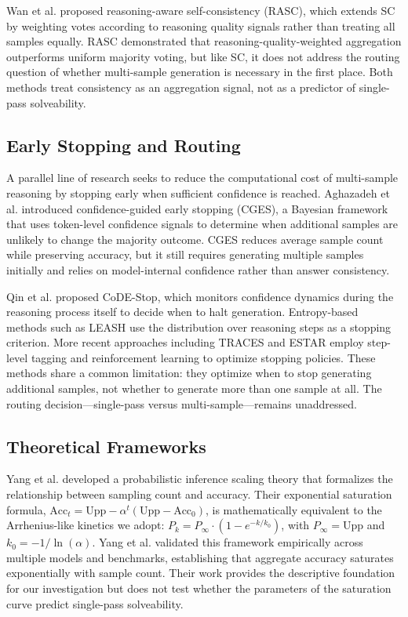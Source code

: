 \documentclass{article}
\begin{document}
Wan et al. \citep{wan2024rasc} proposed reasoning-aware self-consistency (RASC), which extends SC by weighting votes according to reasoning quality signals rather than treating all samples equally. RASC demonstrated that reasoning-quality-weighted aggregation outperforms uniform majority voting, but like SC, it does not address the routing question of whether multi-sample generation is necessary in the first place. Both methods treat consistency as an aggregation signal, not as a predictor of single-pass solveability.

\subsection{Early Stopping and Routing}

A parallel line of research seeks to reduce the computational cost of multi-sample reasoning by stopping early when sufficient confidence is reached. Aghazadeh et al. \citep{aghazadeh2023cges} introduced confidence-guided early stopping (CGES), a Bayesian framework that uses token-level confidence signals to determine when additional samples are unlikely to change the majority outcome. CGES reduces average sample count while preserving accuracy, but it still requires generating multiple samples initially and relies on model-internal confidence rather than answer consistency.

Qin et al. \citep{qin2024codestop} proposed CoDE-Stop, which monitors confidence dynamics during the reasoning process itself to decide when to halt generation. Entropy-based methods such as LEASH \citep{leash2024} use the distribution over reasoning steps as a stopping criterion. More recent approaches including TRACES \citep{traces2024} and ESTAR \citep{estar2024} employ step-level tagging and reinforcement learning to optimize stopping policies. These methods share a common limitation: they optimize when to stop generating additional samples, not whether to generate more than one sample at all. The routing decision---single-pass versus multi-sample---remains unaddressed.

\subsection{Theoretical Frameworks}

Yang et al. \citep{yang2024probabilistic} developed a probabilistic inference scaling theory that formalizes the relationship between sampling count and accuracy. Their exponential saturation formula, $\text{Acc}_t = \text{Upp} - \alpha^t (\text{Upp} - \text{Acc}_0)$, is mathematically equivalent to the Arrhenius-like kinetics we adopt: $P_k = P_\infty \cdot (1 - e^{-k/k_0})$, with $P_\infty = \text{Upp}$ and $k_0 = -1/\ln(\alpha)$. Yang et al. validated this framework empirically across multiple models and benchmarks, establishing that aggregate accuracy saturates exponentially with sample count. Their work provides the descriptive foundation for our investigation but does not test whether the parameters of the saturation curve predict single-pass solveability.
\end{document}
